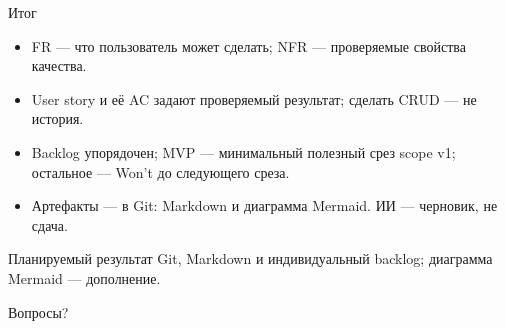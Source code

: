 \begin{frame}{Итог}
  \begin{itemize}\setlength\itemsep{0.38em}
    \item FR --- что пользователь может сделать; NFR --- проверяемые свойства качества.
    \item User story и её AC задают проверяемый результат;
          \flqq сделать CRUD\frqq{} --- не история.
    \item Backlog упорядочен; MVP --- минимальный полезный срез scope v1;
          остальное --- Won't до следующего среза.
    \item Артефакты --- в Git: Markdown и диаграмма Mermaid. ИИ --- черновик, не сдача.
  \end{itemize}

  \vspace{0.7em}
  \begin{block}{Планируемый результат}
    Git, Markdown и индивидуальный backlog; диаграмма Mermaid --- дополнение.
  \end{block}

  \vspace{0.5em}
  {\small\color{acGray}Вопросы?}
\end{frame}
